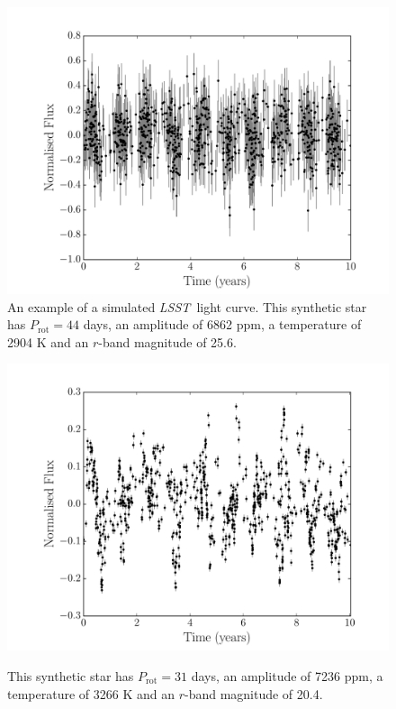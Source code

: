 \documentclass[useAMS, usenatbib, preprint, 12pt]{aastex}
\newcommand{\LSST}{{\it LSST}}
\begin{document}
\begin{figure}
\begin{center}
\includegraphics[width=6in, clip=true]{figures/0000.pdf}
\caption[Example simulated \LSST\ light curve 1.]
{An example of a simulated \LSST\ light curve.
This synthetic star has $P_{\mathrm{rot}} = 44$ days, an amplitude of 6862
ppm, a temperature of 2904 K and an $r$-band magnitude of 25.6.}
\label{fig:demo1}
\end{center}
\end{figure}

\begin{figure}
\begin{center}
\includegraphics[width=6in, clip=true]{figures/0003.pdf}
\caption[Example simulated \LSST\ light curve 2.]
{This synthetic star has $P_{\mathrm{rot}} = 31$ days, an amplitude of 7236
ppm, a temperature of 3266 K and an $r$-band magnitude of 20.4.}
\citet{}
\label{fig:demo2}
\end{center}
\end{figure}
\end{document}
